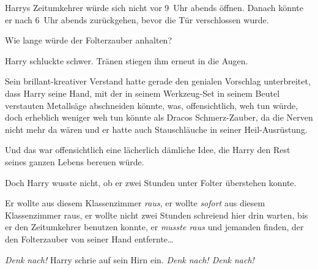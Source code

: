 Harrys Zeitumkehrer würde sich nicht vor 9~Uhr abends öffnen. Danach könnte er nach 6~Uhr abends zurückgehen, bevor die Tür verschlossen wurde.

Wie lange würde der Folterzauber anhalten?

Harry schluckte schwer. Tränen stiegen ihm erneut in die Augen.

Sein brillant-kreativer Verstand hatte gerade den genialen Vorschlag unterbreitet, dass Harry seine Hand, mit der in seinem Werkzeug-Set in seinem Beutel verstauten Metallsäge abschneiden könnte, was, offensichtlich, weh tun würde, doch erheblich weniger weh tun könnte als Dracos Schmerz-Zauber, da die Nerven nicht mehr da wären und er hatte auch Stauschläuche in seiner Heil-Ausrüstung.

Und das war offensichtlich eine lächerlich dämliche Idee, die Harry den Rest seines ganzen Lebens bereuen würde.

Doch Harry wusste nicht, ob er zwei Stunden unter Folter überstehen konnte.

Er wollte aus diesem Klassenzimmer \emph{raus}, er wollte \emph{sofort} aus diesem Klassenzimmer raus, er wollte nicht zwei Stunden schreiend hier drin warten, bis er den Zeitumkehrer benutzen konnte, er \emph{musste raus} und jemanden finden, der den Folterzauber von seiner Hand entfernte…

\emph{Denk nach!} Harry schrie auf sein Hirn ein. \emph{Denk nach! Denk nach!}

\later


